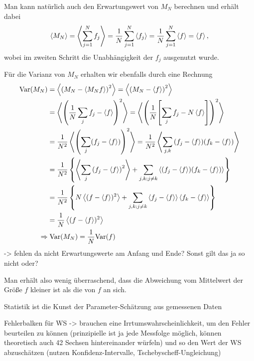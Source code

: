 \documentclass[../KlassMech_main.tex]{subfiles}
\begin{document}
Man kann natürlich auch den Erwartungswert von $M_N$ berechnen und erhält dabei
\begin{equation}\label{key}
\expval{M_N} = \expval{\sum\limits_{j=1}^N f_j} = \frac{1}{N} \sum\limits_{j=1}^N \expval{f_j} = \frac{1}{N} \sum\limits_{j=1}^N \expval{f} = \expval{f} ,
\end{equation}
wobei im zweiten Schritt die Unabhängigkeit der $f_j$ ausgenutzt wurde.

Für die Varianz von $M_N$ erhalten wir ebenfalls durch eine Rechnung
\begin{align}\label{key}
\text{Var}(M_N) & = \expval{\qty(M_N - \langle M_Nf \rangle)^2} = \expval{\qty(M_N - \expval{f})^2}
\notag\\
&= \expval{ \qty(\frac{1}{N} \sum\limits_j f_j - \expval{f})^2} = \expval{ \qty(\frac{1}{N} \qty[ \sum\limits_j f_j - N \expval{f}] )^2}
\notag\\
&= \frac{1}{N^2} \expval{ \qty(\sum\limits_j (f_j - \expval{f}) )^2} = \frac{1}{N^2} \expval{ \sum\limits_{j, k} \qty(f_j - \expval{f}) \qty(f_k - \expval{f})}
\notag\\
&= \frac{1}{N^2} \, \qty{ \expval{ \sum\limits_{j} \qty(f_j - \expval{f})^2 } + \sum\limits_{j, k; j \neq k} \expval{ \qty(f_j - \expval{f}) (f_k - \expval{f})} }
\notag\\
&= \frac{1}{N^2} \, \qty{ N \expval{(f - \expval{f})^2 } + \sum\limits_{j, k; j \neq k} \expval{ f_j - \expval{f} } \expval{ f_k - \expval{f} } }
\notag\\
&= \frac{1}{N} \expval{(f - \expval{f})^2 }
\notag\\
\Rightarrow&  \; \text{Var}(M_N) = \frac{1}{N} \text{Var}(f)
\end{align}
-> fehlen da nicht Erwartungswerte am Anfang und Ende? Sonst gilt das ja so nicht oder?


Man erhält also wenig überraschend, dass die Abweichung vom Mittelwert der Größe $f$ kleiner ist als die von $f$ an sich.




Statistik ist die Kunst der Parameter-Schätzung aus gemessenen Daten

Fehlerbalken für WS -> brauchen eine Irrtumswahrscheinlichkeit, um den Fehler beurteilen zu können (prinzipielle ist ja jede Messfolge möglich, können theoretisch auch 42 Sechsen hintereinander würfeln) und so den Wert der WS abzuschätzen (nutzen Konfidenz-Intervalle, Tschebyscheff-Ungleichung)
\end{document}
